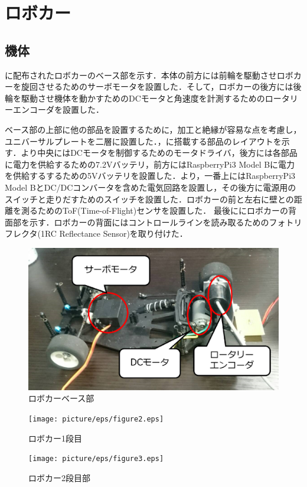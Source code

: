 \section{ロボカー}
\subsection{機体}
に配布されたロボカーのベース部を示す．本体の前方には前輪を駆動させロボカーを旋回させるためのサーボモータを設置した．そして，ロボカーの後方には後輪を駆動させ機体を動かすためのDCモータと角速度を計測するためのロータリーエンコーダを設置した．

ベース部の上部に他の部品を設置するために，加工と絶縁が容易な点を考慮し，ユニバーサルプレートを二層に設置した．，に搭載する部品のレイアウトを示す．より中央にはDCモータを制御するためのモータドライバ，後方には各部品に電力を供給するための7.2Vバッテリ，前方にはRaspberryPi3 Model Bに電力を供給するするための5Vバッテリを設置した．より，一番上にはRaspberryPi3 Model BとDC/DCコンバータを含めた電気回路を設置し，その後方に電源用のスイッチと走りだすためのスイッチを設置した．ロボカーの前と左右に壁との距離を測るためのToF(Time-of-Flight)センサを設置した．
最後ににロボカーの背面部を示す．ロボカーの背面にはコントロールラインを読み取るためのフォトリフレクタ(1RC Reflectance Sensor)を取り付けた．

\begin{figure}[htb]
 \centering
  \includegraphics[width=0.5\hsize]{picture/eps/figure1.eps}
  \caption{ロボカーベース部}
  \label{fig::figure1}
\end{figure}

\begin{figure}[htb]
 \centering
  \texttt{[image: picture/eps/figure2.eps]}
  \caption{ロボカー1段目}
  \label{fig::figure2}
\end{figure}

\begin{figure}[htb]
 \centering
  \texttt{[image: picture/eps/figure3.eps]}
  \caption{ロボカー2段目部}
  \label{fig::figure3}
\end{figure}

